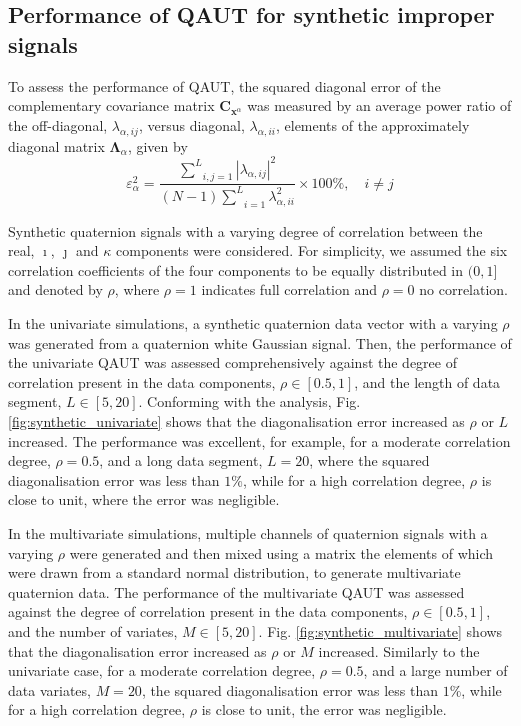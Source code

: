\documentclass[review]{elsarticle}
\theoremstyle{plain}
\theoremstyle{remark}
\theoremstyle{plain}
\theoremstyle{definition}
\theoremstyle{prop}
\theoremstyle{definition}
\theoremstyle{plain}
\theoremstyle{plain}
\begin{document}
\subsection{Performance of QAUT for synthetic improper signals}
To assess the performance of QAUT, the squared diagonal error of the complementary covariance matrix $\mathbf{C}_{\mathbf{x}^\alpha}$ was measured by an average power ratio of the off-diagonal,
$\lambda_{\alpha,ij}$, versus diagonal, $\lambda_{\alpha,ii}$, elements of the
approximately diagonal matrix $\mathbf{\boldsymbol{\Lambda}}_{\alpha}$, given by
\[
\varepsilon_{\alpha}^{2}=\frac{\underset{i,j=1}{\overset{L}{\sum}}\left|\lambda_{\alpha,ij}\right|^{2}}{(N-1)\underset{i=1}{\overset{L}{\sum}}\lambda_{\alpha,ii}^{2}}\times100\%,\quad i \neq j
\]

Synthetic quaternion signals with a varying degree
of correlation between the real, $\imath$, $\jmath$ and $\kappa$ components were considered. For
simplicity, we assumed the six correlation coefficients of the four components to be equally distributed in $(0,1]$ and denoted by $\rho$, where $\rho=1$ indicates full correlation and $\rho=0$ no correlation.

In the univariate simulations, a synthetic quaternion data vector with a varying $\rho$ was generated from a quaternion white Gaussian
signal. Then, the performance of the univariate QAUT was assessed comprehensively against the degree of correlation present in the data components, $\rho\in\left[0.5,1\right]$, and the length of data segment, $L\in\left[5,20\right]$. Conforming with the analysis, Fig. \ref{fig:synthetic_univariate} shows that the diagonalisation error increased as $\rho$ or $L$ increased. The performance was excellent, for example, for a moderate correlation degree, $\rho=0.5$, and a long data segment, $L=20$, where the squared diagonalisation error was less than $1\%$, while for a high correlation degree, $\rho$ is close to unit, where the error was negligible. 

In the multivariate simulations, multiple channels of quaternion signals with a varying $\rho$ were generated and then mixed using a matrix the elements of which were drawn from a standard normal distribution, to generate multivariate quaternion data. The performance of the multivariate QAUT was assessed against the degree of correlation present in the data components, $\rho\in\left[0.5,1\right]$, and the number of variates, $M\in\left[5,20\right]$. Fig. \ref{fig:synthetic_multivariate} shows that the diagonalisation error increased as $\rho$ or $M$ increased. Similarly to the univariate case, for a moderate correlation degree, $\rho=0.5$, and a large number of data variates, $M=20$, the squared diagonalisation error was less than $1\%$, while for a high correlation degree, $\rho$ is close to unit, the error was negligible. 
\end{document}
